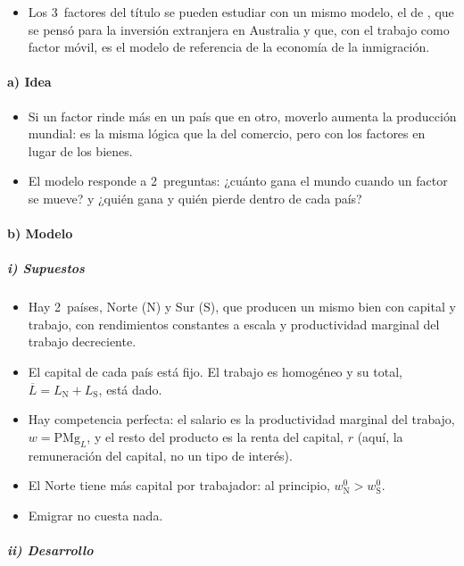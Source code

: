 \documentclass[11pt]{article}
\begin{document}
\begin{itemize}
\item Los 3~factores del título se pueden estudiar con un mismo modelo, el de \textcite{MacDougall1960}, que se pensó para la inversión extranjera en Australia y que, con el trabajo como factor móvil, es el modelo de referencia de la economía de la inmigración\nocite{Borjas2020Labor}.
\end{itemize}

\paragraph{a) Idea}

\begin{itemize}
\item Si un factor rinde más en un país que en otro, moverlo aumenta la producción mundial: es la misma lógica que la del comercio, pero con los factores en lugar de los bienes.
\item El modelo responde a 2~preguntas: ¿cuánto gana el mundo cuando un factor se mueve? y ¿quién gana y quién pierde dentro de cada país?
\end{itemize}

\paragraph{b) Modelo}

\subparagraph{i) Supuestos}

\begin{itemize}
\item Hay 2~países, Norte ($\mathrm N$) y Sur ($\mathrm S$), que producen un mismo bien con capital y trabajo, con rendimientos constantes a escala y productividad marginal del trabajo decreciente.
\item El capital de cada país está fijo. El trabajo es homogéneo y su total, $\overline L=L_{\mathrm N}+L_{\mathrm S}$, está dado.
\item Hay competencia perfecta: el salario es la productividad marginal del trabajo, $w=\mathrm{PMg}_L$, y el resto del producto es la renta del capital, $r$ (aquí, la remuneración del capital, no un tipo de interés).
\item El Norte tiene más capital por trabajador: al principio, $w^0_{\mathrm N}>w^0_{\mathrm S}$.
\item Emigrar no cuesta nada.
\end{itemize}

\subparagraph{ii) Desarrollo}
\end{document}
